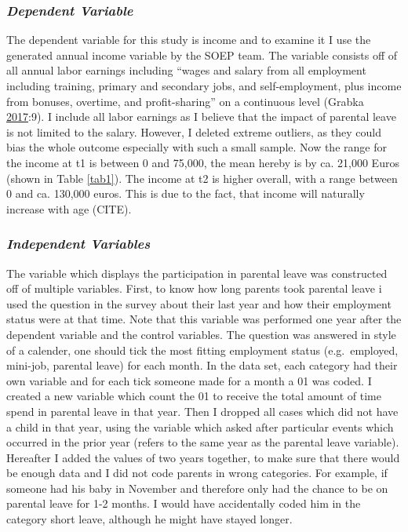 \documentclass[
  12pt,
]{article}
\begin{document}
\hypertarget{dependent-variable}{%
\subsubsection*{\texorpdfstring{\emph{Dependent Variable}}{Dependent Variable}}\label{dependent-variable}}

The dependent variable for this study is income and to examine it I use the generated annual income variable by the SOEP team. The variable consists off of all annual labor earnings including ``wages and salary from all employment including training, primary and secondary jobs, and self-employment, plus income from bonuses, overtime, and profit-sharing'' on a continuous level (Grabka \protect\hyperlink{ref-grabka_soep_2017}{2017}:9). I include all labor earnings as I believe that the impact of parental leave is not limited to the salary. However, I deleted extreme outliers, as they could bias the whole outcome especially with such a small sample. Now the range for the income at t1 is between 0 and 75,000, the mean hereby is by ca. 21,000 Euros (shown in Table \ref{tab1}). The income at t2 is higher overall, with a range between 0 and ca. 130,000 euros. This is due to the fact, that income will naturally increase with age (CITE).

\hypertarget{independent-variables}{%
\subsubsection*{\texorpdfstring{\emph{Independent Variables}}{Independent Variables}}\label{independent-variables}}

The variable which displays the participation in parental leave was constructed off of multiple variables. First, to know how long parents took parental leave i used the question in the survey about their last year and how their employment status were at that time. Note that this variable was performed one year after the dependent variable and the control variables. The question was answered in style of a calender, one should tick the most fitting employment status (e.g.~employed, mini-job, parental leave) for each month. In the data set, each category had their own variable and for each tick someone made for a month a 01 was coded. I created a new variable which count the 01 to receive the total amount of time spend in parental leave in that year. Then I dropped all cases which did not have a child in that year, using the variable which asked after particular events which occurred in the prior year (refers to the same year as the parental leave variable). Hereafter I added the values of two years together, to make sure that there would be enough data and I did not code parents in wrong categories. For example, if someone had his baby in November and therefore only had the chance to be on parental leave for 1-2 months. I would have accidentally coded him in the category short leave, although he might have stayed longer.
\end{document}
